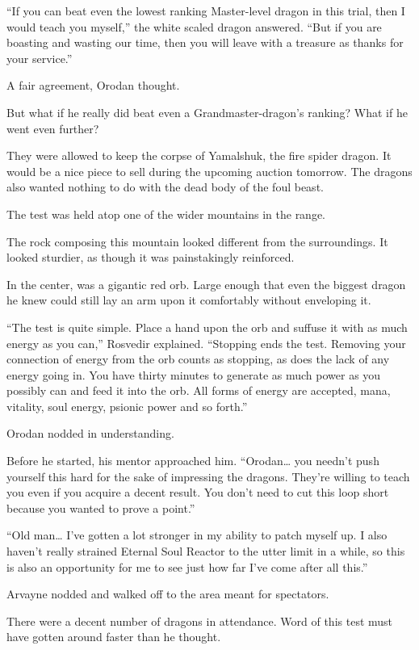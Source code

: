 \documentclass[a4paper,10pt]{book}
\begin{document}
“If you can beat even the lowest ranking Master-level dragon in this trial, then I would teach you myself,” the white scaled dragon answered. “But if you are boasting and wasting our time, then you will leave with a treasure as thanks for your service.”\par
A fair agreement, Orodan thought.\par
But what if he really did beat even a Grandmaster-dragon’s ranking? What if he went even further?\par
\par
They were allowed to keep the corpse of Yamalshuk, the fire spider dragon. It would be a nice piece to sell during the upcoming auction tomorrow. The dragons also wanted nothing to do with the dead body of the foul beast.\par
The test was held atop one of the wider mountains in the range.\par
The rock composing this mountain looked different from the surroundings. It looked sturdier, as though it was painstakingly reinforced.\par
In the center, was a gigantic red orb. Large enough that even the biggest dragon he knew could still lay an arm upon it comfortably without enveloping it.\par
“The test is quite simple. Place a hand upon the orb and suffuse it with as much energy as you can,” Rosvedir explained. “Stopping ends the test. Removing your connection of energy from the orb counts as stopping, as does the lack of any energy going in. You have thirty minutes to generate as much power as you possibly can and feed it into the orb. All forms of energy are accepted, mana, vitality, soul energy, psionic power and so forth.”\par
Orodan nodded in understanding.\par
Before he started, his mentor approached him. “Orodan… you needn’t push yourself this hard for the sake of impressing the dragons. They’re willing to teach you even if you acquire a decent result. You don’t need to cut this loop short because you wanted to prove a point.”\par
“Old man… I’ve gotten a lot stronger in my ability to patch myself up. I also haven’t really strained Eternal Soul Reactor to the utter limit in a while, so this is also an opportunity for me to see just how far I’ve come after all this.”\par
Arvayne nodded and walked off to the area meant for spectators.\par
There were a decent number of dragons in attendance. Word of this test must have gotten around faster than he thought.\par
\end{document}
